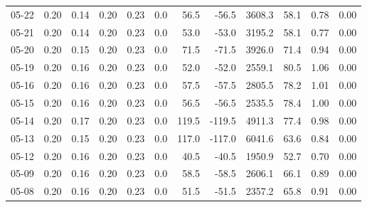\begin{threeparttable}
{\begin{tabular}{lrrrrrrrrrrr}
  05-22 &          0.20 &          0.14 &          0.20 &        0.23 &                 0.0 &                56.5 &      -56.5 &              3608.3 &             58.1 &            0.78 &                   0.00 \\
  05-21 &          0.20 &          0.14 &          0.20 &        0.23 &                 0.0 &                53.0 &      -53.0 &              3195.2 &             58.1 &            0.77 &                   0.00 \\
  05-20 &          0.20 &          0.15 &          0.20 &        0.23 &                 0.0 &                71.5 &      -71.5 &              3926.0 &             71.4 &            0.94 &                   0.00 \\
  05-19 &          0.20 &          0.16 &          0.20 &        0.23 &                 0.0 &                52.0 &      -52.0 &              2559.1 &             80.5 &            1.06 &                   0.00 \\
  05-16 &          0.20 &          0.16 &          0.20 &        0.23 &                 0.0 &                57.5 &      -57.5 &              2805.5 &             78.2 &            1.01 &                   0.00 \\
  05-15 &          0.20 &          0.16 &          0.20 &        0.23 &                 0.0 &                56.5 &      -56.5 &              2535.5 &             78.4 &            1.00 &                   0.00 \\
  05-14 &          0.20 &          0.17 &          0.20 &        0.23 &                 0.0 &               119.5 &     -119.5 &              4911.3 &             77.4 &            0.98 &                   0.00 \\
  05-13 &          0.20 &          0.15 &          0.20 &        0.23 &                 0.0 &               117.0 &     -117.0 &              6041.6 &             63.6 &            0.84 &                   0.00 \\
  05-12 &          0.20 &          0.16 &          0.20 &        0.23 &                 0.0 &                40.5 &      -40.5 &              1950.9 &             52.7 &            0.70 &                   0.00 \\
  05-09 &          0.20 &          0.16 &          0.20 &        0.23 &                 0.0 &                58.5 &      -58.5 &              2606.1 &             66.1 &            0.89 &                   0.00 \\
  05-08 &          0.20 &          0.16 &          0.20 &        0.23 &                 0.0 &                51.5 &      -51.5 &              2357.2 &             65.8 &            0.91 &                   0.00 \\

\end{tabular}}
\end{threeparttable}

